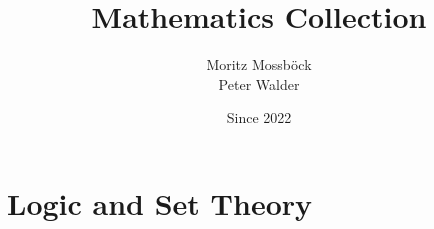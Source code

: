 \documentclass{report}
\author{Moritz Mossböck \\ Peter Walder}
\title{Mathematics Collection}
\date{Since 2022}
\begin{document}
    
    \chapter{Logic and Set Theory}
    
\end{document}
